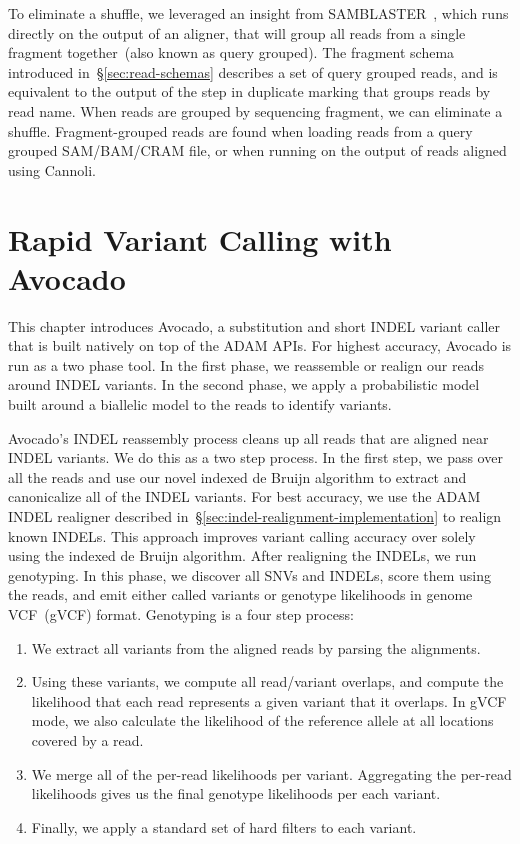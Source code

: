 \documentclass[phd]{ucbthesis}
\begin{document}
To eliminate a shuffle, we leveraged an insight from
{SAMBLASTER}~\cite{faust14}, which runs directly on the output of an
aligner, that will group all reads from a single fragment together~(also known
as query grouped). The fragment schema introduced in~\S\ref{sec:read-schemas}
describes a set of query grouped reads, and is equivalent to the output of the
step in duplicate marking that groups reads by read name. When reads are grouped
by sequencing fragment, we can eliminate a shuffle. Fragment-grouped reads are
found when loading reads from a query grouped
SAM/BAM/CRAM file, or when running on the output of reads aligned using
{Cannoli}.

\chapter{Rapid Variant Calling with {Avocado}}
\label{chap:avocado}

This chapter introduces {Avocado}, a substitution and short INDEL variant
caller that is built natively on top of the {ADAM} APIs. For highest
accuracy, {Avocado} is run as a two phase tool. In the first phase, we
reassemble or realign our reads around INDEL variants. In the second phase, we
apply a probabilistic model built around a biallelic model to the reads to
identify variants.

{Avocado}'s INDEL reassembly process cleans up all reads that are aligned
near INDEL variants. We do this as a two step process. In the first step, we
pass over all the reads and use our novel indexed de Bruijn algorithm to extract
and canonicalize all of the INDEL variants. For best accuracy, we use the
{ADAM} INDEL realigner described
in~\S\ref{sec:indel-realignment-implementation} to realign known INDELs. This
approach improves variant calling accuracy over solely using the indexed de Bruijn
algorithm.
After realigning the INDELs, we run genotyping. In this phase, we discover all
SNVs and INDELs, score them using the reads, and emit either called variants
or genotype likelihoods in genome VCF~(gVCF) format. Genotyping is a four step
process:

\begin{enumerate}
\item We extract all variants from the aligned reads by parsing the alignments.
\item Using these variants, we compute all read/variant overlaps, and compute
the likelihood that each read represents a given variant that it overlaps. In
gVCF mode, we also calculate the likelihood of the reference allele at all
locations covered by a read.
\item We merge all of the per-read likelihoods per variant. Aggregating the
  per-read likelihoods gives us the final genotype likelihoods per each variant.
\item Finally, we apply a standard set of hard filters to each variant.
\end{enumerate}
\end{document}
